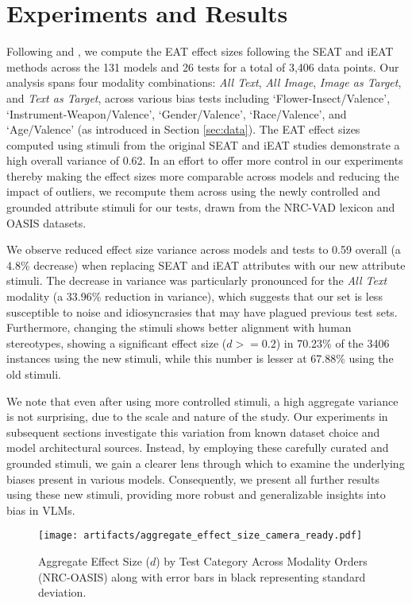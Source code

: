 \section{Experiments and Results}

Following \citet{May2019OnEncoders} and \citet{Steed2021}, we compute the EAT effect sizes following the SEAT and iEAT methods across the 131 models and 26 tests for a total of 3,406 data points. Our analysis spans four modality combinations: \textit{All Text}, \textit{All Image}, \textit{Image as Target}, and \textit{Text as Target}, across various bias tests including  `Flower-Insect/Valence', `Instrument-Weapon/Valence', `Gender/Valence', `Race/Valence', and `Age/Valence' (as introduced in Section \ref{sec:data}). The EAT effect sizes computed using stimuli from the original SEAT and iEAT studies demonstrate a high overall variance of 0.62. In an effort to offer more control in our experiments thereby making the effect sizes more comparable across models and reducing the impact of outliers, we recompute them across using the newly controlled and grounded attribute stimuli for our tests, drawn from the NRC-VAD lexicon \cite{mohammad2018obtaining} and OASIS \cite{kurdi2017introducing} datasets. 

We observe reduced effect size variance across models and tests to 0.59 overall (a 4.8\% decrease) when replacing SEAT and iEAT attributes with our new attribute stimuli. The decrease in variance was particularly pronounced for the \textit{All Text} modality (a 33.96\% reduction in variance), which suggests that our set is less susceptible to noise and idiosyncrasies that may have plagued previous test sets. Furthermore, changing the stimuli shows better alignment with human stereotypes, showing a significant effect size ($d>=0.2$) in 70.23\% of the 3406 instances using the new stimuli, while this number is lesser at 67.88\% using the old stimuli. 

We note that even after using more controlled stimuli, a high aggregate variance is not surprising, due to the scale and nature of the study. Our experiments in subsequent sections investigate this variation from known dataset choice and model architectural sources. Instead, by employing these carefully curated and grounded stimuli, we gain a clearer lens through which to examine the underlying biases present in various models. Consequently, we present all further results using these new stimuli, providing more robust and generalizable insights into bias in VLMs.


\begin{figure}[h]
    \centering
    \texttt{[image: artifacts/aggregate\_effect\_size\_camera\_ready.pdf]}
    \caption{Aggregate Effect Size ($d$) by Test Category Across Modality Orders (NRC-OASIS) along with error bars in black representing standard deviation.}
    \label{fig:eat_aggregate}
\end{figure}

